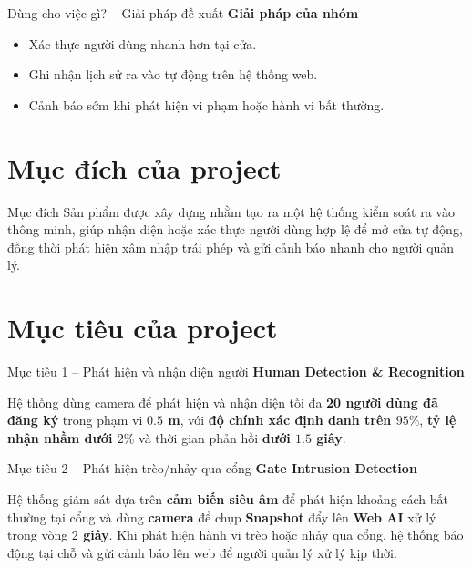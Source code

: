 \documentclass[aspectratio=169]{beamer}
\begin{document}
\begin{frame}{Dùng cho việc gì? -- Giải pháp đề xuất}
  \textbf{Giải pháp của nhóm}

  \vspace{0.8em}
  \begin{itemize}
    \item Xác thực người dùng nhanh hơn tại cửa.
    \item Ghi nhận lịch sử ra vào tự động trên hệ thống web.
    \item Cảnh báo sớm khi phát hiện vi phạm hoặc hành vi bất thường.
  \end{itemize}
\end{frame}

\section{Mục đích của project}

\begin{frame}{Mục đích}
  Sản phẩm được xây dựng nhằm tạo ra một hệ thống kiểm soát ra vào thông minh, giúp nhận diện hoặc xác thực người dùng hợp lệ để mở cửa tự động, đồng thời phát hiện xâm nhập trái phép và gửi cảnh báo nhanh cho người quản lý.
\end{frame}

\section{Mục tiêu của project}

\begin{frame}{Mục tiêu 1 -- Phát hiện và nhận diện người}
  \textbf{Human Detection \& Recognition}

  \vspace{0.8em}
  Hệ thống dùng camera để phát hiện và nhận diện tối đa \textbf{20 người dùng đã đăng ký} trong phạm vi \textbf{$0.5$ m}, với \textbf{độ chính xác định danh trên $95\%$}, \textbf{tỷ lệ nhận nhầm dưới $2\%$} và thời gian phản hồi \textbf{dưới $1.5$ giây}.
\end{frame}

\begin{frame}{Mục tiêu 2 -- Phát hiện trèo/nhảy qua cổng}
  \textbf{Gate Intrusion Detection}

  \vspace{0.8em}
  Hệ thống giám sát dựa trên \textbf{cảm biến siêu âm} để phát hiện khoảng cách bất thường tại cổng và dùng \textbf{camera} để chụp \textbf{Snapshot} đẩy lên \textbf{Web AI} xử lý trong vòng \textbf{$2$ giây}. Khi phát hiện hành vi trèo hoặc nhảy qua cổng, hệ thống báo động tại chỗ và gửi cảnh báo lên web để người quản lý xử lý kịp thời.
\end{frame}
\end{document}
